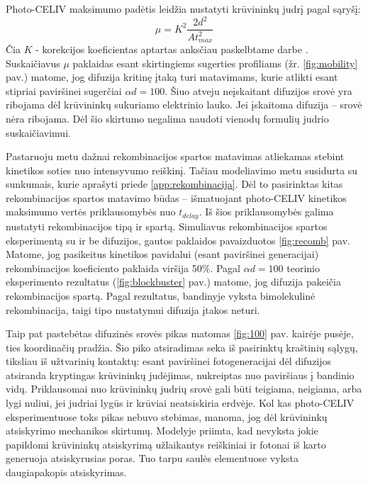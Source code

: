 Photo-CELIV maksimumo padėtis leidžia nustatyti krūvininkų judrį pagal sąryšį:
\begin{equation}
\label{eq:judris}
\mu = K^2 \frac{2d^2}{At_{max}^2}
\end{equation}
Čia \(K\) - korekcijos koeficientas aptartas anksčiau paskelbtame darbe \cite{juška:155202}. Suskaičiavus \(\mu\) paklaidas esant skirtingiems sugerties profiliams (žr. \ref{fig:mobility} pav.) matome, jog difuzija kritinę įtaką turi matavimams, kurie atlikti esant stipriai paviršinei sugerčiai \(\alpha d = 100\). Šiuo atveju neįskaitant difuzijos srovė yra ribojama dėl krūvininkų sukuriamo elektrinio lauko. Jei įskaitoma difuzija -- srovė nėra ribojama. Dėl šio skirtumo negalima naudoti vienodų formulių judrio suskaičiavimui.

Pastaruoju metu dažnai rekombinacijos spartos matavimas atliekamas stebint kinetikos soties nuo intensyvumo reiškinį. Tačiau modeliavimo metu susidurta su sunkumais, kurie aprašyti priede \ref{app:rekombinacija}. Dėl to pasirinktas kitas rekombinacijos spartos matavimo būdas -- išmatuojant photo-CELIV kinetikos maksimumo vertės priklausomybės nuo \(t_{delay}\).
Iš šios priklausomybės galima nustatyti rekombinacijos tipą ir spartą.
Simuliavus rekombinacijos spartos eksperimentą su ir be difuzijos, gautos paklaidos pavaizduotos \ref{fig:recomb} pav. Matome, jog pasikeitus kinetikos pavidalui (esant paviršinei generacijai) rekombinacijos koeficiento paklaida viršija 50\%. Pagal \(\alpha d = 100\) teorinio eksperimento rezultatus (\ref{fig:blockbuster} pav.) matome, jog difuzija pakeičia rekombinacijos spartą. Pagal rezultatus, bandinyje vyksta bimolekulinė rekombinacija, taigi tipo nustatymui difuzija įtakos neturi.

Taip pat pastebėtas difuzinės srovės pikas matomas \ref{fig:100} pav. kairėje pusėje, ties koordinačių pradžia. Šio piko atsiradimas seka iš pasirinktų kraštinių sąlygų, tiksliau iš užtvarinių kontaktų: esant paviršinei fotogeneracijai dėl difuzijos atsiranda kryptingas krūvininkų judėjimas, nukreiptas nuo paviršiaus į bandinio vidų. Priklausomai nuo krūvininkų judrių srovė gali būti teigiama, neigiama, arba lygi nuliui, jei judriai lygūs ir krūviai neatsiskiria erdvėje. Kol kas photo-CELIV eksperimentuose toks pikas nebuvo stebimas, manoma, jog dėl krūvininkų atsiskyrimo mechanikos skirtumų. Modelyje priimta, kad nevyksta jokie papildomi krūvininkų atsiskyrimą užlaikantys reiškiniai ir fotonai iš karto generuoja atsiskyrusias poras. Tuo tarpu saulės elementuose vyksta daugiapakopis atsiskyrimas.

